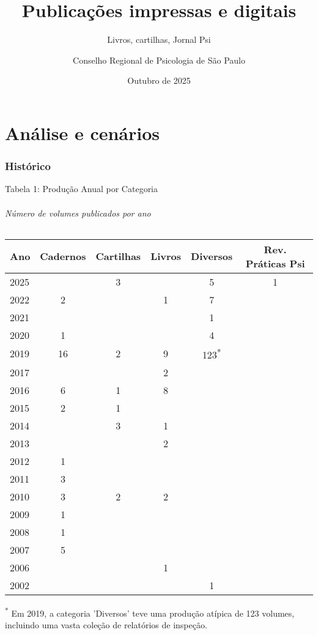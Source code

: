 \documentclass{beamer}
\title{Publicações impressas e digitais}
\subtitle{\textcolor{crpPrincipal}{Livros, cartilhas, Jornal Psi}}
\author{Conselho Regional de Psicologia de São Paulo}
\date{Outubro de 2025}
\begin{document}
\begin{frame}[plain]
    \titlepage
\end{frame}

\part{Análise e cenários}
\section{Histórico}

\begin{frame}[fragile]{Tabela 1: Produção Anual por Categoria}
    \framesubtitle{Número de volumes publicados por ano}
    \tiny %
    \begin{tabular}{l c c c c c}
        \toprule
        \textbf{Ano} & \textbf{Cadernos} & \textbf{Cartilhas} & \textbf{Livros} & \textbf{Diversos} & \textbf{Rev. Práticas Psi} \\
        \midrule
        2025 & & 3 & & 5 & 1 \\
        2022 & 2 & & 1 & 7 & \\
        2021 & & & & 1 & \\
        2020 & 1 & & & 4 & \\
        2019 & 16 & 2 & 9 & 123\textsuperscript{*} & \\
        2017 & & & 2 & & \\
        2016 & 6 & 1 & 8 & & \\
        2015 & 2 & 1 & & & \\
        2014 & & 3 & 1 & & \\
        2013 & & & 2 & & \\
        2012 & 1 & & & & \\
        2011 & 3 & & & & \\
        2010 & 3 & 2 & 2 & & \\
        2009 & 1 & & & & \\
        2008 & 1 & & & & \\
        2007 & 5 & & & & \\
        2006 & & & 1 & & \\
        2002 & & & & 1 & \\
        \bottomrule
    \end{tabular}
    
    \vspace{1em}
    \scriptsize %
    \textsuperscript{*} Em 2019, a categoria 'Diversos' teve uma produção atípica de 123 volumes, incluindo uma vasta coleção de relatórios de inspeção.
\end{frame}
\end{document}
